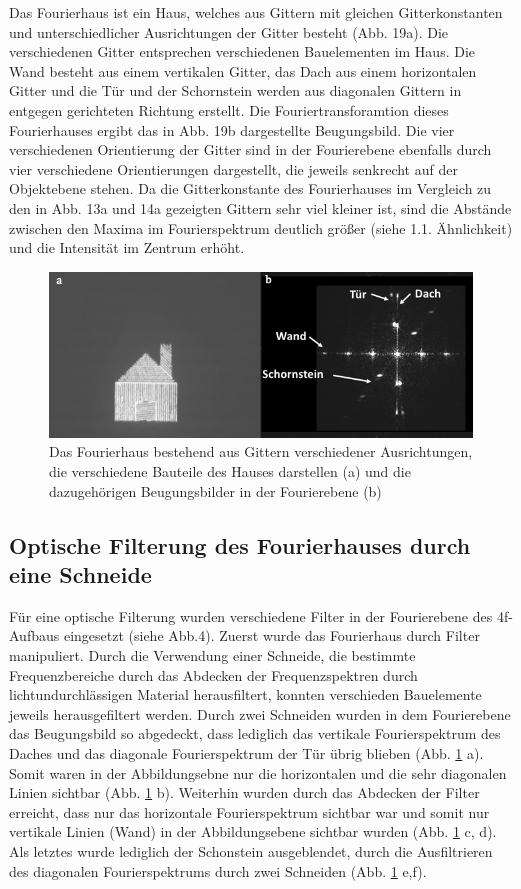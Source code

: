 Das Fourierhaus ist ein Haus, welches aus Gittern mit gleichen Gitterkonstanten und unterschiedlicher Ausrichtungen der Gitter besteht (Abb. 19a). Die verschiedenen Gitter entsprechen verschiedenen Bauelementen im Haus. Die Wand besteht aus einem vertikalen Gitter, das Dach aus einem horizontalen Gitter und die Tür und der Schornstein werden aus diagonalen Gittern in entgegen gerichteten Richtung erstellt. Die Fouriertransforamtion dieses
Fourierhauses ergibt das in Abb. 19b dargestellte Beugungsbild. Die vier verschiedenen Orientierung der Gitter sind in der Fourierebene ebenfalls durch vier verschiedene Orientierungen dargestellt, die jeweils senkrecht auf der Objektebene stehen. Da die Gitterkonstante des Fourierhauses im Vergleich zu den in Abb. 13a und 14a gezeigten Gittern sehr viel kleiner ist, sind die Abstände zwischen den Maxima im Fourierspektrum deutlich größer (siehe 1.1. Ähnlichkeit) und die Intensität im Zentrum erhöht.

\begin{figure}[h]
	\centering
	\includegraphics[width=0.10\linewidth]{Regina/abb20}
	\caption[Fourierhaus mit Fourierspektrum]{Das Fourierhaus   bestehend aus Gittern verschiedener Ausrichtungen, die 
	verschiedene Bauteile des Hauses darstellen (a) und die dazugehörigen Beugungsbilder in der Fourierebene (b)}
	\label{fig:fourierhaus_und_spektrum}
\end{figure}

\subsection{Optische Filterung des Fourierhauses durch eine Schneide}

Für eine optische Filterung wurden verschiedene Filter in der Fourierebene des 4f-Aufbaus eingesetzt (siehe Abb.4). Zuerst wurde das Fourierhaus durch Filter manipuliert. Durch die Verwendung einer Schneide, die bestimmte Frequenzbereiche durch das Abdecken der Frequenzspektren durch lichtundurchlässigen Material herausfiltert, konnten verschieden Bauelemente jeweils herausgefiltert werden. Durch zwei Schneiden wurden in dem
Fourierebene das Beugungsbild so abgedeckt, dass lediglich das vertikale Fourierspektrum des Daches und das diagonale Fourierspektrum der Tür übrig blieben (Abb. \ref{fig:fourierhaus_und_spektrum} a). Somit waren
in der Abbildungsebne nur die horizontalen und die sehr diagonalen Linien sichtbar (Abb. \ref{fig:fourierhaus_und_spektrum} b). Weiterhin wurden durch das Abdecken der Filter erreicht, dass nur das horizontale Fourierspektrum sichtbar war und somit nur vertikale Linien (Wand) in der Abbildungsebene
sichtbar wurden (Abb. \ref{fig:fourierhaus_und_spektrum} c, d). Als letztes wurde lediglich der Schonstein ausgeblendet, durch die Ausfiltrieren des diagonalen Fourierspektrums durch zwei Schneiden (Abb. \ref{fig:fourierhaus_und_spektrum} e,f).

